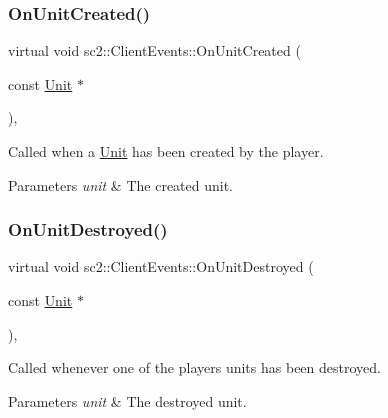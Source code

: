 \subsubsection{\texorpdfstring{On\+Unit\+Created()}{OnUnitCreated()}}
{\footnotesize\ttfamily virtual void sc2\+::\+Client\+Events\+::\+On\+Unit\+Created (\begin{DoxyParamCaption}\item[{const \hyperlink{classsc2_1_1_unit}{Unit} $\ast$}]{ }\end{DoxyParamCaption})\hspace{0.3cm}{\ttfamily [inline]}, {\ttfamily [virtual]}}

Called when a \hyperlink{classsc2_1_1_unit}{Unit} has been created by the player. 
\begin{DoxyParams}{Parameters}
{\em unit} & The created unit. \\
\hline
\end{DoxyParams}
\mbox{\label{classsc2_1_1_client_events_a17297ffdf866ab1f4c3c31de64a1bc59}} 
\subsubsection{\texorpdfstring{On\+Unit\+Destroyed()}{OnUnitDestroyed()}}
{\footnotesize\ttfamily virtual void sc2\+::\+Client\+Events\+::\+On\+Unit\+Destroyed (\begin{DoxyParamCaption}\item[{const \hyperlink{classsc2_1_1_unit}{Unit} $\ast$}]{ }\end{DoxyParamCaption})\hspace{0.3cm}{\ttfamily [inline]}, {\ttfamily [virtual]}}

Called whenever one of the player\textquotesingle{}s units has been destroyed. 
\begin{DoxyParams}{Parameters}
{\em unit} & The destroyed unit. \\
\hline
\end{DoxyParams}
\mbox{\label{classsc2_1_1_client_events_a3d73b5a3462f757397ea5ac2f4aca8dc}} 
